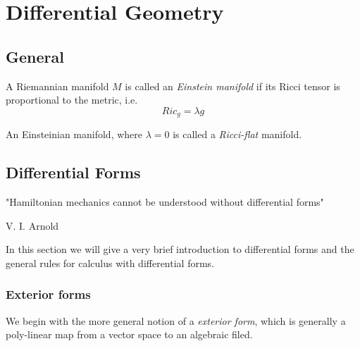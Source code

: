 \chapter{Differential Geometry}

\section{General}
\begin{definition}
A Riemannian manifold $M$ is called an \textit{Einstein manifold} if its Ricci tensor is proportional to the metric, i.e.
\begin{equation}
Ric_g = \lambda g
\end{equation}
\end{definition}
\begin{remark}
An Einsteinian manifold, where $\lambda=0$ is called a \textit{Ricci-flat} manifold.
\end{remark}

\section{Differential Forms}
\epigraph{"Hamiltonian mechanics cannot be understood without differential
forms"}{V. I. Arnold}

In this section we will give a very brief introduction to differential forms
and the general rules for calculus with differential forms. 
\subsection{Exterior forms}
We begin with the more general notion of a \textit{exterior form}, which is
generally a poly-linear map from a vector space to an algebraic filed.
